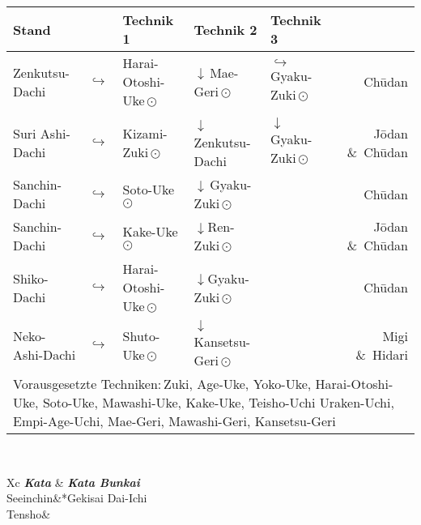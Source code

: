 \begin{tcolorbox}[width=\textwidth,height=\textheight,right=12pt,left=12pt,colframe=BRBELT,colback=white,fonttitle=\bfseries,coltitle=white,title=3. Kyu:\indent Kihon-Ido Kata - Partnerformen - Erwartungshorizont]
	\null\vfill\null
	\begin{tabularx}{\textwidth}{llllXr}
		\textbf{Stand} 	&  	& \textbf{Technik 1} & \textbf{Technik 2} & \textbf{Technik 3}&\\
		\midrule
		Zenkutsu-Dachi 	& \(\hookrightarrow\)	& Harai-Otoshi-Uke\,\(\odot\) 	& \(\downarrow\)\,Mae-Geri\,\(\odot\)	& \(\hookrightarrow\) 	 Gyaku-Zuki\,\(\odot\)	& Ch\={u}dan \\
		Suri Ashi-Dachi	& \(\hookrightarrow\)	& Kizami-Zuki\,\(\odot\)		& \(\downarrow\)\,Zenkutsu-Dachi & \(\downarrow\)	 Gyaku-Zuki\,\(\odot\)	& J\={o}dan \&~Ch\={u}dan \\
		Sanchin-Dachi 	& \(\hookrightarrow\)	& Soto-Uke\,\(\odot\) 			& \(\downarrow\)\,Gyaku-Zuki\,\(\odot\) 				&						&	 					 Ch\={u}dan \\
		Sanchin-Dachi 	& \(\hookrightarrow\)	& Kake-Uke\,\(\odot\) 			& \(\downarrow\)Ren-Zuki\,\(\odot\) 					&						& 						 J\={o}dan \&~Ch\={u}dan \\
		Shiko-Dachi 	& \(\hookrightarrow\)	& Harai-Otoshi-Uke\,\(\odot\) 	& \(\downarrow\)Gyaku-Zuki\,\(\odot\) 				&						& 						 Ch\={u}dan \\
		Neko-Ashi-Dachi	& \(\hookrightarrow\)	& Shuto-Uke\,\(\odot\) 			& \(\downarrow\)Kansetsu-Geri\,\(\odot\) 					&						& 						 Migi \&~Hidari  \\
		\multicolumn{6}{p{\linewidth-2\tabcolsep}}{{\footnotesize Vorausgesetzte Techniken:\,Zuki, Age-Uke, Yoko-Uke, Harai-Otoshi-Uke, Soto-Uke, Mawashi-Uke, Kake-Uke, Teisho-Uchi Uraken-Uchi, Empi-Age-Uchi, Mae-Geri, Mawashi-Geri, Kansetsu-Geri}}\\
		\midrule
	\end{tabularx}\\
	\null\vfill\null
	\begin{center}
		\begin{minipage}[t]{0.45\textwidth}
			\begin{tabularx}{\textwidth}{Xc}
				\midrule
				\textbf{\textit{Kata}} & \textbf{\textit{Kata Bunkai}} \\
				Seeinchin&*{Gekisai Dai-Ichi}\\
				Tensho& \\
				\midrule
			\end{tabularx}

\end{minipage}
\end{center}
\end{tcolorbox}
